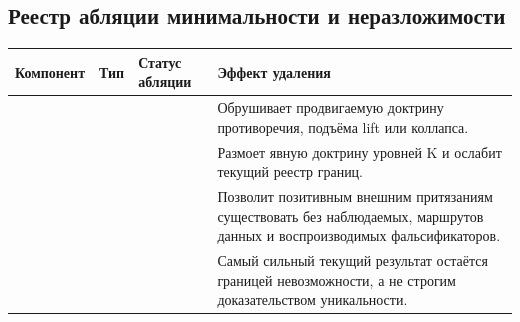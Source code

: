 \subsection{Реестр абляции минимальности и неразложимости}
\begin{center}
\begin{tabular}{@{}L{0.20\textwidth}L{0.14\textwidth}L{0.23\textwidth}L{0.35\textwidth}@{}}
\toprule
Компонент & Тип & Статус абляции & Эффект удаления \\
\midrule
{} &  &  & Обрушивает продвигаемую доктрину противоречия, подъёма lift или коллапса. \\
 &  &  & Размоет явную доктрину уровней K и ослабит текущий реестр границ. \\
 &  &  & Позволит позитивным внешним притязаниям существовать без наблюдаемых, маршрутов данных и воспроизводимых фальсификаторов. \\
 &  &  & Самый сильный текущий результат остаётся границей невозможности, а не строгим доказательством уникальности. \\
\bottomrule
\end{tabular}
\end{center}

